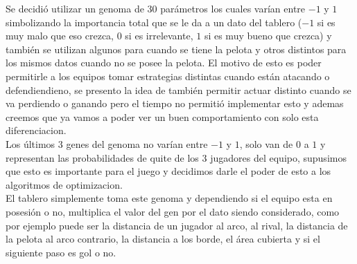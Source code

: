Se decidió utilizar un genoma de 30 parámetros los cuales varían entre $-1$ y $1$ simbolizando la importancia total
que se le da a un dato del tablero ($-1$ si es muy malo que eso crezca, $0$ si es irrelevante, $1$ si es muy bueno que crezca)
y también se utilizan algunos para cuando se tiene la pelota y otros distintos para los mismos datos
cuando no se posee la pelota. El motivo de esto es poder permitirle a los equipos tomar estrategias distintas cuando están
atacando o defendiendieno, se presento la idea de también permitir actuar distinto cuando se va perdiendo o ganando pero
el tiempo no permitió implementar esto y ademas creemos que ya vamos a poder ver un buen comportamiento con solo esta
diferenciacion.\\

Los últimos 3 genes del genoma no varían entre $-1$ y $1$, solo van de $0$ a $1$ y representan las probabilidades de quite
de los 3 jugadores del equipo, supusimos que esto es importante para el juego y decidimos darle el poder de esto
a los algoritmos de optimizacion.\\


El tablero simplemente toma este genoma y dependiendo si el equipo esta en posesión o no, multiplica el valor del gen por
el dato siendo considerado, como por ejemplo puede ser la distancia de un jugador al arco, al rival, la distancia de la pelota
al arco contrario, la distancia a los borde, el área cubierta y si el siguiente paso es gol o no.
